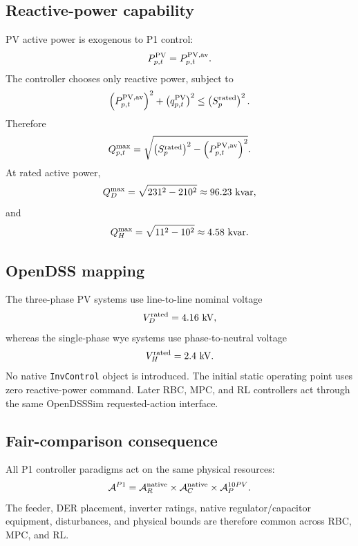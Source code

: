 \subsection{Reactive-power capability}
PV active power is exogenous to P1 control:
\[
P_{p,t}^{\rm PV}=P_{p,t}^{\rm PV,av}.
\]
The controller chooses only reactive power, subject to
\[
\left(P_{p,t}^{\rm PV,av}\right)^2+
\left(q_{p,t}^{\rm PV}\right)^2
\le
\left(S_p^{\rm rated}\right)^2.
\]
Therefore
\[
Q_{p,t}^{\max}
=
\sqrt{
\left(S_p^{\rm rated}\right)^2-
\left(P_{p,t}^{\rm PV,av}\right)^2
}.
\]
At rated active power,
\[
Q_D^{\max}=\sqrt{231^2-210^2}\approx 96.23~{\rm kvar},
\]
and
\[
Q_H^{\max}=\sqrt{11^2-10^2}\approx 4.58~{\rm kvar}.
\]

\subsection{OpenDSS mapping}
The three-phase PV systems use line-to-line nominal voltage
\[
V_D^{\rm rated}=4.16~{\rm kV},
\]
whereas the single-phase wye systems use phase-to-neutral voltage
\[
V_H^{\rm rated}=2.4~{\rm kV}.
\]
No native \texttt{InvControl} object is introduced. The initial static operating
point uses zero reactive-power command. Later RBC, MPC, and RL controllers act
through the same OpenDSSSim requested-action interface.

\subsection{Fair-comparison consequence}
All P1 controller paradigms act on the same physical resources:
\[
\mathcal A^{P1}
=
\mathcal A_R^{\rm native}
\times
\mathcal A_C^{\rm native}
\times
\mathcal A_P^{10PV}.
\]
The feeder, DER placement, inverter ratings, native regulator/capacitor
equipment, disturbances, and physical bounds are therefore common across RBC,
MPC, and RL.
